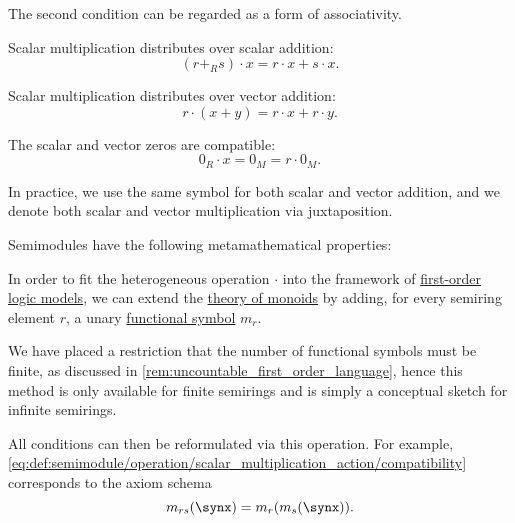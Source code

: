 \begin{definition}
\begin{thmenum}[series=def:semimodule]
\begin{thmenum}
      The second condition can be regarded as a form of associativity.

       Scalar multiplication distributes over scalar addition:
      \begin{equation}\label{eq:def:semimodule/operation/scalar_addition_distributivity}
        (r +_R s) \cdot x = r \cdot x + s \cdot x.
      \end{equation}

       Scalar multiplication distributes over vector addition:
      \begin{equation}\label{eq:def:semimodule/operation/vector_addition_distributivity}
        r \cdot (x + y) = r \cdot x + r \cdot y.
      \end{equation}

       The scalar and vector zeros are compatible:
      \begin{equation}\label{eq:def:semimodule/operation/absorption}
        0_R \cdot x = 0_M = r \cdot 0_M.
      \end{equation}
    \end{thmenum}

    In practice, we use the same symbol for both scalar and vector addition, and we denote both scalar and vector multiplication via juxtaposition.
  \end{thmenum}

  Semimodules have the following metamathematical properties:
  \begin{thmenum}[resume=def:semimodule]
    \mimprovised In order to fit the heterogeneous operation \( \cdot \) into the framework of \hyperref[def:first_order_model]{first-order logic models}, we can extend the \hyperref[def:monoid/theory]{theory of monoids} by adding, for every semiring element \( r \), a unary \hyperref[def:first_order_language/fun]{functional symbol} \( m_r \).

    We have placed a restriction that the number of functional symbols must be finite, as discussed in \cref{rem:uncountable_first_order_language}, hence this method is only available for finite semirings and is simply a conceptual sketch for infinite semirings.

    All conditions can then be reformulated via this operation. For example, \eqref{eq:def:semimodule/operation/scalar_multiplication_action/compatibility} corresponds to the axiom schema
    \begin{equation*}
      m_{rs}(\synx) = m_r(m_s(\synx)).
    \end{equation*}


\end{thmenum}
\end{definition}
